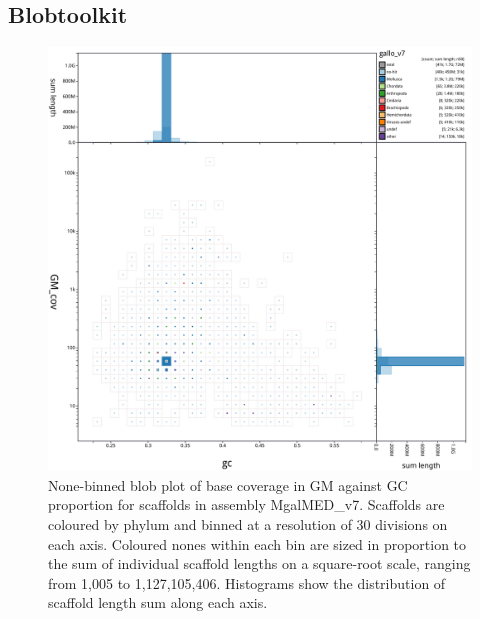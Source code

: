 \documentclass[11pt, a4paper]{article}
\begin{document}
\subsection*{Blobtoolkit}

\begin{figure}
	\includegraphics[width=\linewidth]{figures/btk_blob_MgalMED_v7}
	\caption{None-binned blob plot of base coverage in GM against GC proportion for scaffolds in assembly MgalMED\_v7. Scaffolds are coloured by phylum and binned at a resolution of 30 divisions on each axis. Coloured nones within each bin are sized in proportion to the sum of individual scaffold lengths on a square-root scale, ranging from 1,005 to 1,127,105,406. Histograms show the distribution of scaffold length sum along each axis.}
	\label{supfig:btk-blob-MgalMED}
\end{figure}
\end{document}
